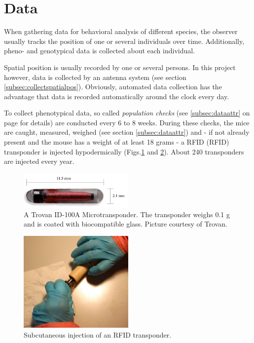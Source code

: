 \newpage
\section{Data}
\label{sec:datacollection}

When gathering data for behavioral analysis of different species, the observer usually tracks the position of one or several individuals over time. Additionally, pheno- and genotypical data is collected about each individual.

Spatial position is usually recorded by one or several persons. In this project however, data is collected by an antenna system (see section \ref{subsec:collectspatialpos}). Obviously, automated data collection has the advantage that data is recorded automatically around the clock every day.

To collect phenotypical data, so called \textit{population checks} (see \ref{subsec:dataattr} on page \pageref{subsec:dataattr} for details) are conducted every 6 to 8 weeks. During these checks, the mice are caught, measured, weighed (see section \ref{subsec:dataattr}) and - if not already present and the mouse has a weight of at least 18 grams - a \ac{RFID} (RFID) transponder is injected hypodermically (Figs.\ref{fig:transponder} and \ref{fig:inject_rfid}). About 240 transponders are injected every year.

\begin{figure}[htpb]
\begin{center}
\includegraphics[width=0.5\textwidth]{assets/pdf/transponder.pdf}
  \caption[Trovan ID-100A Microtransponder]{A Trovan ID-100A Microtransponder. The transponder weighs 0.1 g and is coated with biocompatible glass. \footnotesize Picture courtesy of Trovan.}
  \label{fig:transponder}
\end{center}
\end{figure}
\begin{figure}[htpb]
\begin{center}
\includegraphics[width=0.5\textwidth]{assets/pdf/transponder_inject.pdf}
  \caption[Subcutaneous injection of an RFID transponder]{Subcutaneous injection of an RFID transponder.}
  \label{fig:inject_rfid}
\end{center}
\end{figure}

